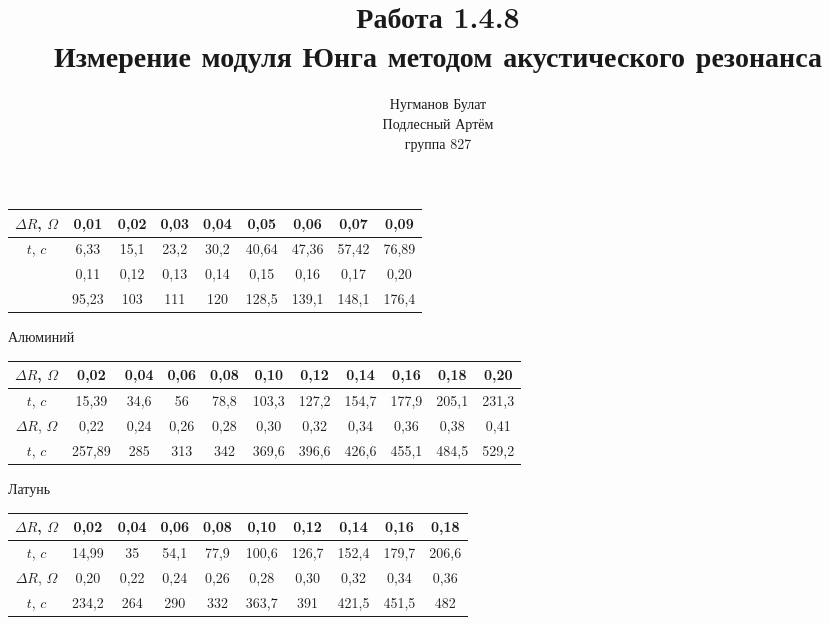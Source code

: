 \documentclass[a4paper, 10pt]{article}%
\author{Нугманов Булат \\ Подлесный Артём \\ группа 827}
\title{Работа 1.4.8 \\ Измерение модуля Юнга методом 
акустического резонанса}
\begin{document}
\begin{table}[]
\begin{tabular}{|c|c|c|c|c|c|c|c|c|}
\hline
\rowcolor[HTML]{EFEFEF} 
$\Delta R$, $\Omega$ & 0,01  & 0,02 & 0,03 & 0,04 & 0,05  & 0,06  & 0,07  & 0,09  \\ \hline
$t$, $c$             & 6,33  & 15,1 & 23,2 & 30,2 & 40,64 & 47,36 & 57,42 & 76,89 \\ \hline
\rowcolor[HTML]{EFEFEF} 
                     & 0,11  & 0,12 & 0,13 & 0,14 & 0,15  & 0,16  & 0,17  & 0,20  \\ \hline
                     & 95,23 & 103  & 111  & 120  & 128,5 & 139,1 & 148,1 & 176,4 \\ \hline
\end{tabular}
\end{table}
Алюминий\\
\begin{table}[]
\begin{tabular}{|c|c|c|c|c|c|c|c|c|c|c|}
\hline
\rowcolor[HTML]{EFEFEF} 
$\Delta R$, $\Omega$ & 0,02   & 0,04 & 0,06 & 0,08 & 0,10  & 0,12  & 0,14  & 0,16  & 0,18  & 0,20  \\ \hline
$t$, $c$             & 15,39  & 34,6 & 56   & 78,8 & 103,3 & 127,2 & 154,7 & 177,9 & 205,1 & 231,3 \\ \hline
\rowcolor[HTML]{EFEFEF} 
$\Delta R$, $\Omega$ & 0,22   & 0,24 & 0,26 & 0,28 & 0,30  & 0,32  & 0,34  & 0,36  & 0,38  & 0,41  \\ \hline
$t$, $c$             & 257,89 & 285  & 313  & 342  & 369,6 & 396,6 & 426,6 & 455,1 & 484,5 & 529,2 \\ \hline
\end{tabular}
\end{table}
Латунь\\
\begin{table}[h]
\begin{tabular}{|c|c|c|c|c|c|c|c|c|c|}
\hline
\rowcolor[HTML]{EFEFEF} 
$\Delta R$, $\Omega$ & 0,02  & 0,04 & 0,06 & 0,08 & 0,10  & 0,12  & 0,14  & 0,16  & 0,18  \\ \hline
$t$, $c$             & 14,99 & 35   & 54,1 & 77,9 & 100,6 & 126,7 & 152,4 & 179,7 & 206,6 \\ \hline
\rowcolor[HTML]{EFEFEF} 
$\Delta R$, $\Omega$ & 0,20  & 0,22 & 0,24 & 0,26 & 0,28  & 0,30  & 0,32  & 0,34  & 0,36  \\ \hline
$t$, $c$             & 234,2 & 264  & 290  & 332  & 363,7 & 391   & 421,5 & 451,5 & 482   \\ \hline
\end{tabular}
\end{table}
\end{document}
